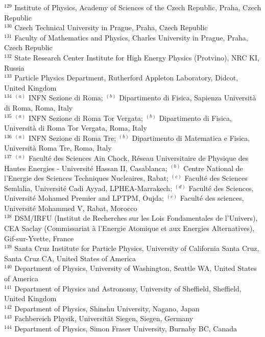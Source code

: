 \begin{flushleft}
$^{129}$ Institute of Physics, Academy of Sciences of the Czech Republic, Praha, Czech Republic\\
$^{130}$ Czech Technical University in Prague, Praha, Czech Republic\\
$^{131}$ Faculty of Mathematics and Physics, Charles University in Prague, Praha, Czech Republic\\
$^{132}$ State Research Center Institute for High Energy Physics (Protvino), NRC KI, Russia\\
$^{133}$ Particle Physics Department, Rutherford Appleton Laboratory, Didcot, United Kingdom\\
$^{134}$ $^{(a)}$ INFN Sezione di Roma; $^{(b)}$ Dipartimento di Fisica, Sapienza Universit{\`a} di Roma, Roma, Italy\\
$^{135}$ $^{(a)}$ INFN Sezione di Roma Tor Vergata; $^{(b)}$ Dipartimento di Fisica, Universit{\`a} di Roma Tor Vergata, Roma, Italy\\
$^{136}$ $^{(a)}$ INFN Sezione di Roma Tre; $^{(b)}$ Dipartimento di Matematica e Fisica, Universit{\`a} Roma Tre, Roma, Italy\\
$^{137}$ $^{(a)}$ Facult{\'e} des Sciences Ain Chock, R{\'e}seau Universitaire de Physique des Hautes Energies - Universit{\'e} Hassan II, Casablanca; $^{(b)}$ Centre National de l'Energie des Sciences Techniques Nucleaires, Rabat; $^{(c)}$ Facult{\'e} des Sciences Semlalia, Universit{\'e} Cadi Ayyad, LPHEA-Marrakech; $^{(d)}$ Facult{\'e} des Sciences, Universit{\'e} Mohamed Premier and LPTPM, Oujda; $^{(e)}$ Facult{\'e} des sciences, Universit{\'e} Mohammed V, Rabat, Morocco\\
$^{138}$ DSM/IRFU (Institut de Recherches sur les Lois Fondamentales de l'Univers), CEA Saclay (Commissariat {\`a} l'Energie Atomique et aux Energies Alternatives), Gif-sur-Yvette, France\\
$^{139}$ Santa Cruz Institute for Particle Physics, University of California Santa Cruz, Santa Cruz CA, United States of America\\
$^{140}$ Department of Physics, University of Washington, Seattle WA, United States of America\\
$^{141}$ Department of Physics and Astronomy, University of Sheffield, Sheffield, United Kingdom\\
$^{142}$ Department of Physics, Shinshu University, Nagano, Japan\\
$^{143}$ Fachbereich Physik, Universit{\"a}t Siegen, Siegen, Germany\\
$^{144}$ Department of Physics, Simon Fraser University, Burnaby BC, Canada\\

\end{flushleft}
